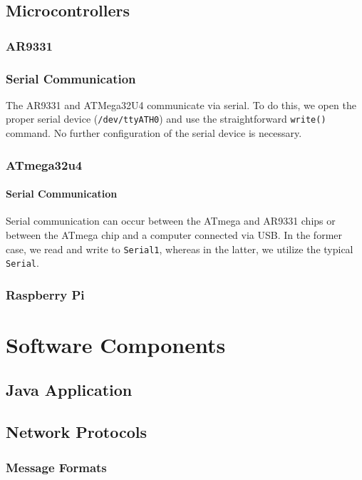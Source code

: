 \documentclass[letterpaper,12pt]{article}
\begin{document}
\subsection{Microcontrollers}
\subsubsection{AR9331}

\subsubsection{Serial Communication}
\label{sec:ar9331_serial_com}
The AR9331 and ATMega32U4 communicate via serial. To do this, we open the proper
serial device (\texttt{/dev/ttyATH0}) and use the straightforward
\texttt{write()} command. No further configuration of the serial device is
necessary.

\subsubsection{ATmega32u4}

\paragraph{Serial Communication}
\label{sec:atmega_serial_com}

Serial communication can occur between the ATmega and AR9331 chips or between
the ATmega chip and a computer connected via USB. In the former case, we read
and write to \texttt{Serial1}, whereas in the latter, we utilize the typical
\texttt{Serial}.

\subsubsection{Raspberry Pi}

\section{Software Components}
\subsection{Java Application}

\subsection{Network Protocols}

\subsubsection{Message Formats}
\end{document}
